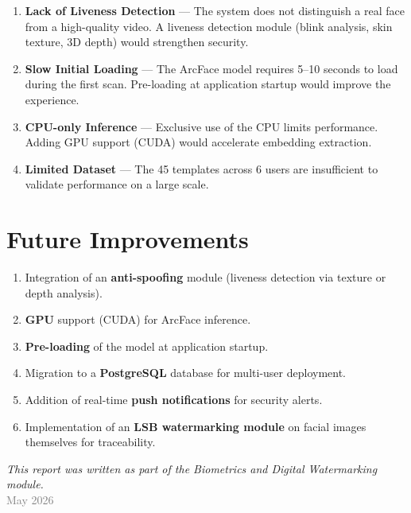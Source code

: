 \begin{enumerate}
    \item \textbf{Lack of Liveness Detection} — The system does not distinguish a real face from a high-quality video. A liveness detection module (blink analysis, skin texture, 3D depth) would strengthen security.

    \item \textbf{Slow Initial Loading} — The ArcFace model requires 5--10 seconds to load during the first scan. Pre-loading at application startup would improve the experience.

    \item \textbf{CPU-only Inference} — Exclusive use of the CPU limits performance. Adding GPU support (CUDA) would accelerate embedding extraction.

    \item \textbf{Limited Dataset} — The 45 templates across 6 users are insufficient to validate performance on a large scale.
\end{enumerate}

\section{Future Improvements}

\begin{enumerate}
    \item Integration of an \textbf{anti-spoofing} module (liveness detection via texture or depth analysis).
    \item \textbf{GPU} support (CUDA) for ArcFace inference.
    \item \textbf{Pre-loading} of the model at application startup.
    \item Migration to a \textbf{PostgreSQL} database for multi-user deployment.
    \item Addition of real-time \textbf{push notifications} for security alerts.
    \item Implementation of an \textbf{LSB watermarking module} on facial images themselves for traceability.
\end{enumerate}

\vspace{1cm}

\begin{center}
\end{center}

\vspace{0.5cm}

\begin{center}
    {\large\textit{This report was written as part of the Biometrics and Digital Watermarking module.}}\\[0.3cm]
    {\textcolor{gray}{May 2026}}
\end{center}
